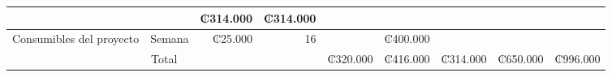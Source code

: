 \documentclass[12pt]{article}
\begin{document}
\begin{table}[h!]
{\begin{tabular}{|llrrlllll|}
    \multicolumn{1}{l|}{} &
    \multicolumn{1}{l|}{} &
    \multicolumn{1}{r|}{₡314.000} &
    \multicolumn{1}{r|}{₡314.000} &
     \\ \hline
  \multicolumn{1}{|l|}{Consumibles del proyecto} &
    \multicolumn{1}{l|}{Semana} &
    \multicolumn{1}{r|}{₡25.000} &
    \multicolumn{1}{r|}{16} &
    \multicolumn{1}{l|}{} &
    \multicolumn{1}{r|}{₡400.000} &
    \multicolumn{1}{l|}{} &
    \multicolumn{1}{l|}{} &
     \\ \hline
  \multicolumn{4}{|c|}{Total} &
    \multicolumn{1}{r|}{₡320.000} &
    \multicolumn{1}{r|}{₡416.000} &
    \multicolumn{1}{r|}{₡314.000} &
    \multicolumn{1}{r|}{₡650.000} &
    \multicolumn{1}{r|}{₡996.000} \\ \hline
  \end{tabular}%
  }
  \end{table}
\end{document}
